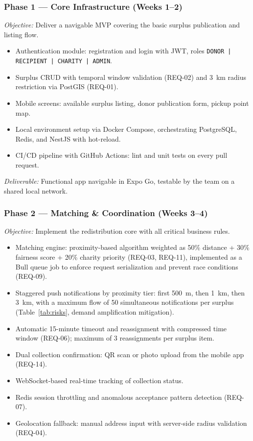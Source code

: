 \documentclass[conference]{IEEEtran}
\begin{document}
\subsubsection{Phase 1 — Core Infrastructure (Weeks 1–2)}

\textit{Objective:} Deliver a navigable MVP covering the basic surplus publication and listing flow.

\begin{itemize}
  \item Authentication module: registration and login with JWT, roles \texttt{DONOR | RECIPIENT | CHARITY | ADMIN}.
  \item Surplus CRUD with temporal window validation (REQ-02) and 3~km radius restriction via PostGIS (REQ-01).
  \item Mobile screens: available surplus listing, donor publication form, pickup point map.
  \item Local environment setup via Docker Compose, orchestrating PostgreSQL, Redis, and NestJS with hot-reload.
  \item CI/CD pipeline with GitHub Actions: lint and unit tests on every pull request.
\end{itemize}

\textit{Deliverable:} Functional app navigable in Expo Go, testable by the team on a shared local network.

\subsubsection{Phase 2 — Matching \& Coordination (Weeks 3–4)}

\textit{Objective:} Implement the redistribution core with all critical business rules.

\begin{itemize}
  \item Matching engine: proximity-based algorithm weighted as 50\% distance + 30\% fairness score + 20\% charity priority (REQ-03, REQ-11), implemented as a Bull queue job to enforce request serialization and prevent race conditions (REQ-09).
  \item Staggered push notifications by proximity tier: first 500~m, then 1~km, then 3~km, with a maximum flow of 50 simultaneous notifications per surplus (Table~\ref{tab:risks}, demand amplification mitigation).
  \item Automatic 15-minute timeout and reassignment with compressed time window (REQ-06); maximum of 3 reassignments per surplus item.
  \item Dual collection confirmation: QR scan or photo upload from the mobile app (REQ-14).
  \item WebSocket-based real-time tracking of collection status.
  \item Redis session throttling and anomalous acceptance pattern detection (REQ-07).
  \item Geolocation fallback: manual address input with server-side radius validation (REQ-04).
\end{itemize}
\end{document}
